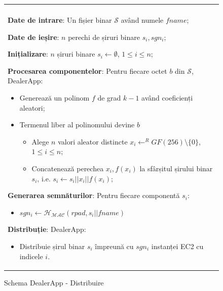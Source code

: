 \documentclass[oneside, 12pt]{book}
\begin{document}
\begin{figure}[h!]

\begin{tabular}{|p{\textwidth}|}
\hline

\\
\hspace{.1in}
\textbf{Date de intrare}: Un fișier binar $\mathcal{S}$ având numele $fname$;
\medskip

\hspace{.1in}
\textbf{Date de ieșire}: $n$ perechi de șiruri binare $s_i, sgn_i$;
\medskip

\hspace{.1in}
\textbf{Inițializare}: $n$ șiruri binare $s_i \leftarrow \emptyset$, $1 \leq i \leq n$;
\medskip

\hspace{.1in}
\textbf{Procesarea componentelor}: Pentru fiecare octet $b$ din $\mathcal{S}$, DealerApp:
	\begin{itemize}
		\item Generează un polinom $f$ de grad $k - 1$ având coeficienți aleatori;
		\item Termenul liber al polinomului devine $b$
		\begin{itemize}
			\item Alege $n$ valori aleator distincte $x_i \leftarrow^R GF(256) \setminus \{0\}$, $1 \leq i \leq n$;
			\item Concatenează perechea $x_i, f(x_i)$ la sfârșitul șirului binar $s_i$, i.e. $s_i \leftarrow s_i || x_i || f(x_i)$;
		\end{itemize}
	\end{itemize}
\medskip

\hspace{.1in}
\medskip
\textbf{Generarea semnăturilor}: Pentru fiecare componentă $s_i$:
	\begin{itemize}
		\item $sgn_i \leftarrow \mathcal{H_{MAC}}(rpad, s_i || fname)$
	\end{itemize}

\medskip
\hspace{.1in}	
\textbf{Distribuție}: DealerApp:
	\begin{itemize}
		\item Distribuie șirul binar $s_i$ împreună cu $sgn_i$ instanței EC2 cu indicele $i$.
	\end{itemize}

\\
\hline
\end{tabular}
\caption{Schema DealerApp - Distribuire}
\label{fig:dealerapp_distribution}
\end{figure}
\end{document}
